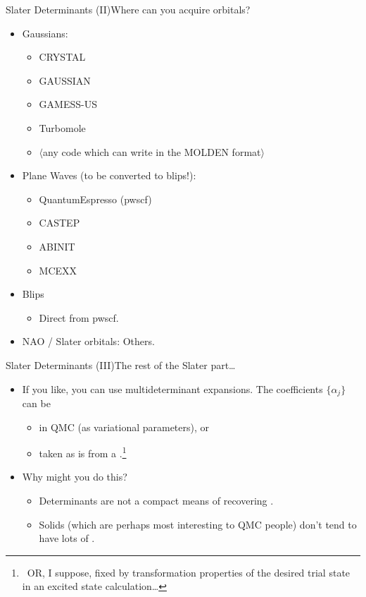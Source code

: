\documentclass[12pt, pdf, hyperref={draft}, usenames, dvipsnames,
aspectratio=169]{beamer}
\newcommand{\red}[1]{{\bf\color{LancsRed}{#1}}}
\newcommand{\blue}[1]{{\bf\color{NavyBlue}{#1}}}
\newcommand{\green}[1]{{\bf\color{ForestGreen}{#1}}}
\begin{document}
\begin{frame}{Slater Determinants (II)}{Where can you acquire orbitals?}
\begin{itemize}
  \item Gaussians:
  \begin{itemize}
    \item CRYSTAL
    \item GAUSSIAN
    \item GAMESS-US
    \item Turbomole
    \item $\langle$any code which can write in the MOLDEN format$\rangle$
  \end{itemize}
  \item Plane Waves (to be converted to blips!):
  \begin{itemize}
    \item QuantumEspresso (pwscf)
    \item CASTEP
    \item ABINIT
    \item MCEXX
  \end{itemize}
  \item Blips
  \begin{itemize}
    \item Direct from pwscf.
  \end{itemize}
  \item NAO / Slater orbitals: Others.
\end{itemize}
\end{frame}


\begin{frame}{Slater Determinants (III)}{The rest of the Slater part\ldots}
\begin{itemize}
  \item If you like, you can use multideterminant expansions. The coefficients
  $\{ \alpha_j \}$ can be
  \begin{itemize}
    \item \green{optimised} in QMC (as variational
  parameters), or
    \item taken as is from a \blue{post-HF method}.\footnote{\ OR, I suppose,
  fixed by transformation properties of the desired trial state in an excited
  state calculation\ldots}
  \end{itemize}

  \item Why might you \red{not want to} do this?
  \begin{itemize}
    \item Determinants are not a compact means of recovering \blue{correlation
    energy}.
    \item Solids (which are perhaps most interesting to QMC people) don't tend
    to have lots of \blue{multi-reference character}.
  \end{itemize}
\end{itemize}
\end{frame}
\end{document}
